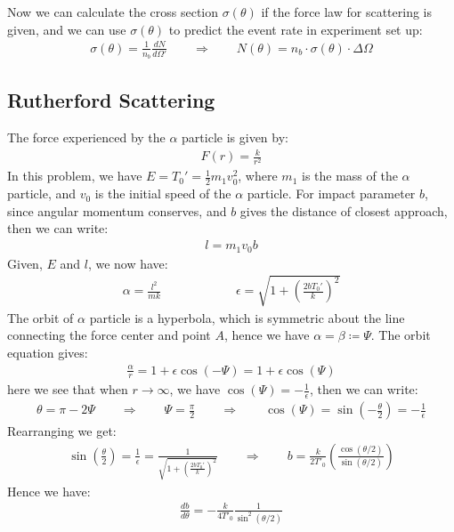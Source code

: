 \documentclass[11pt,oneside]{book}
\theoremstyle{break}
\theoremstyle{break}
\begin{document}
Now we can calculate the cross section $\sigma(\theta)$ if the force law for scattering is given, and we can use $\sigma(\theta)$ to predict the event rate in experiment set up:
\begin{align*}
\sigma(\theta) = \frac{1}{n_b}\frac{dN}{d\Omega'}\qquad \Rightarrow \qquad N(\theta) = n_b\cdot \sigma(\theta)\cdot \Delta \Omega
\end{align*}

\subsection*{Rutherford Scattering}
The force experienced by the $\alpha$ particle is given by:
\begin{align*}
F(r) = \frac{k}{r^2}
\end{align*}
In this problem, we have $E = T_0' = \frac{1}{2}m_1 v_0^2$, where $m_1$ is the mass of the $\alpha$ particle, and $v_0$ is the initial speed of the $\alpha$ particle. For impact parameter $b$, since angular momentum conserves, and $b$ gives the distance of closest approach, then we can write:
\begin{align*}
l = m_1 v_0 b
\end{align*}
Given, $E$ and $l$, we now have:
\begin{align*}
\alpha = \frac{l^2}{mk}\qquad\qquad\qquad \epsilon = \sqrt{1+ \left(\frac{2bT_0'}{k} \right)^2}
\end{align*}
The orbit of $\alpha$ particle is a hyperbola, which is symmetric about the line connecting the force center and point $A$, hence we have $\alpha = \beta  \coloneqq \Psi$. 
The orbit equation gives:
\begin{align*}
\frac{\alpha}{r} = 1+ \epsilon \cos(-\Psi) = 1+ \epsilon\cos(\Psi) 
\end{align*}
here we see that when $r \to \infty$, we have $\cos(\Psi) = -\frac{1}{\epsilon}$, then we can write:
\begin{align*}
\theta = \pi - 2\Psi \qquad\Rightarrow \qquad \Psi=\frac{\pi}{2} \qquad \Rightarrow \qquad \cos(\Psi) = \sin\left(-\frac{\theta}{2}\right) = -\frac{1}{\epsilon}
\end{align*}
Rearranging we get:
\begin{align*}
\sin\left(\frac{\theta}{2} \right) = \frac{1}{\epsilon} = \frac{1}{\sqrt{1+ \left(\frac{2bT_0'}{k} \right)^2}} \qquad \Rightarrow \qquad b=\frac{k}{2T'_0} \left( \frac{\cos(\theta/2)}{\sin(\theta/2)}\right)
\end{align*}
Hence we have:
\begin{align*}
\frac{db}{d\theta} = -\frac{k}{4T'_0}\frac{1}{\sin^2(\theta/2)}
\end{align*}
\end{document}

